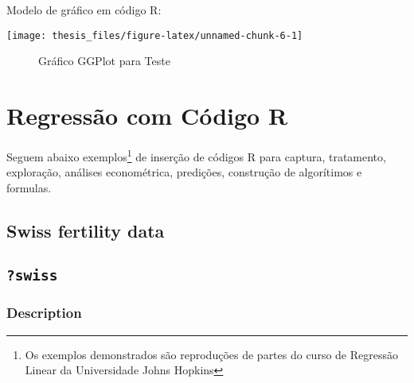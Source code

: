 \documentclass[12pt,openright,oneside,a4paper,chapter=TITLE,section=TITLE,subsection=Title,english,french,spanish,portugues,sumario=tradicional]{04-class-files/abntex2}
\newenvironment{Shaded}{\begin{snugshade}}{\end{snugshade}}
\newcommand{\DataTypeTok}[1]{\textcolor[rgb]{0.13,0.29,0.53}{#1}}
\newcommand{\DecValTok}[1]{\textcolor[rgb]{0.00,0.00,0.81}{#1}}
\newcommand{\KeywordTok}[1]{\textcolor[rgb]{0.13,0.29,0.53}{\textbf{#1}}}
\newcommand{\NormalTok}[1]{#1}
\newcommand{\OperatorTok}[1]{\textcolor[rgb]{0.81,0.36,0.00}{\textbf{#1}}}
\newcommand{\StringTok}[1]{\textcolor[rgb]{0.31,0.60,0.02}{#1}}
\begin{document}
Modelo de gráfico em código R:

\begin{center}\texttt{[image: thesis\_files/figure-latex/unnamed-chunk-6-1]} \end{center}
\begin{figure}[!htb]
\centering
\caption{Gráfico GGPlot para Teste}
\label{fig:ggplot}
\end{figure}

\section{Regressão com Código R}

Seguem abaixo exemplos\footnote{Os exemplos demonstrados são reproduções de partes do curso de Regressão Linear da Universidade Johns Hopkins} de inserção de códigos R para captura, tratamento, exploração, análises econométrica, predições, construção de algorítimos e formulas.

\hypertarget{swiss-fertility-data}{%
\subsection{Swiss fertility data}\label{swiss-fertility-data}}

\begin{Shaded}
\end{Shaded}

\hypertarget{swiss}{%
\subsection{\texorpdfstring{\texttt{?swiss}}{?swiss}}\label{swiss}}

\hypertarget{description}{%
\subsubsection{Description}\label{description}}
\end{document}
